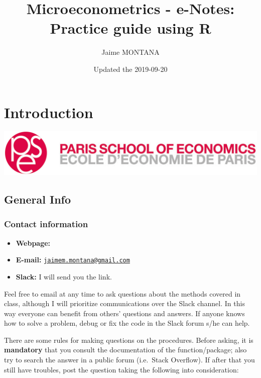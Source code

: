\documentclass[]{book}
\title{Microeconometrics - e-Notes: Practice guide using R}
\author{Jaime MONTANA}
\date{Updated the 2019-09-20}
\providecommand{\tightlist}{%
  \setlength{\itemsep}{0pt}\setlength{\parskip}{0pt}}
\begin{document}
\maketitle

{
\setcounter{tocdepth}{1}
\tableofcontents
}
\chapter{Introduction}\label{introduction}

\begin{center}\includegraphics[width=0.9\linewidth]{./images/1200px-Logo_pse_petit} \end{center}

\section{General Info}\label{general-info}

\subsection{Contact information}\label{contact-information}

\begin{itemize}
\tightlist
\item
  \textbf{Webpage:}
\item
  \textbf{E-mail:}
  \href{mailto:jaimem.montana@gmail.com}{\nolinkurl{jaimem.montana@gmail.com}}
\item
  \textbf{Slack:} I will send you the link.
\end{itemize}

Feel free to email at any time to ask questions about the methods
covered in class, although I will prioritize communications over the
Slack channel. In this way everyone can benefit from others' questions
and answers. If anyone knows how to solve a problem, debug or fix the
code in the Slack forum s/he can help.

There are some rules for making questions on the procedures. Before
asking, it is \textbf{mandatory} that you consult the documentation of
the function/package; also try to search the answer in a public forum
(i.e.~Stack Overflow). If after that you still have troubles, post the
question taking the following into consideration:
\end{document}

